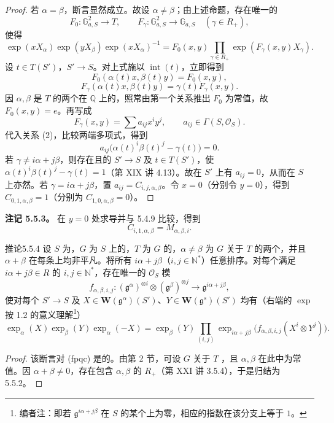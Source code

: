 \begin{proof}
若 $\alpha=\beta$，断言显然成立。故设 $\alpha\ne\beta$；由上述命题，存在唯一的
\[F_0:\mathbb G_{a,S}^2\to T,\qquad F_\gamma:\mathbb G_{a,S}^2\to\mathbb G_{a,S}\quad(\gamma\in R_+),\]
使得
\[\exp(xX_\alpha)\exp(yX_\beta)\exp(xX_\alpha)^{-1}
=F_0(x,y)\prod_{\gamma\in R_+}\exp(F_\gamma(x,y)X_\gamma).\]
设 $t\in T(S')$，$S'\to S$。对上式施以 $\operatorname{int}(t)$，立即得到
\[F_0(\alpha(t)x,\beta(t)y)=F_0(x,y),\tag{1}\]
\[F_\gamma(\alpha(t)x,\beta(t)y)=\gamma(t)F_\gamma(x,y).\tag{2}\]
因 $\alpha,\beta$ 是 $T$ 的两个在 $\mathbb Q$ 上的，照常由第一个关系推出 $F_0$ 为常值，故 $F_0(x,y)=e$。再写成
\[F_\gamma(x,y)=\sum a_{ij}x^iy^j,\qquad a_{ij}\in\Gamma(S,\mathcal O_S).\]
代入关系 (2)，比较两端多项式，得到
\[a_{ij}\bigl(\alpha(t)^i\beta(t)^j-\gamma(t)\bigr)=0.\]
若 $\gamma\ne i\alpha+j\beta$，则存在且的 $S'\to S$ 及 $t\in T(S')$，使 $\alpha(t)^i\beta(t)^j-\gamma(t)=1$（第 XIX 讲 4.13）。故在 $S'$ 上有 $a_{ij}=0$，从而在 $S$ 上亦然。若 $\gamma=i\alpha+j\beta$，置 $a_{ij}=C_{i,j,\alpha,\beta}$。令 $x=0$（分别令 $y=0$），得到 $C_{0,1,\alpha,\beta}=1$（分别为 $C_{1,0,\alpha,\beta}=0$）。
\end{proof}
\textbf{注记 5.5.3。} 在 $y=0$ 处求导并与 5.4.9 比较，得到
\[C_{i,1,\alpha,\beta}=M_{\alpha,\beta,i}.\]
\begin{SGAresult}{推论}{5.5.4}
设 $S$ 为，$G$ 为 $S$ 上的，$T$ 为 $G$ 的，$\alpha\ne\beta$ 为 $G$ 关于 $T$ 的两个，并且 $\alpha+\beta$ 在每条上均非平凡。将所有 $i\alpha+j\beta$（$i,j\in\mathbb N^*$）任意排序。对每个满足 $i\alpha+j\beta\in R$ 的 $i,j\in\mathbb N^*$，存在唯一的 $\mathcal O_S$ 模
\[f_{\alpha,\beta,i,j}:(\mathfrak g^\alpha)^{\otimes i}\otimes(\mathfrak g^\beta)^{\otimes j}\longrightarrow\mathfrak g^{i\alpha+j\beta},\]
使对每个 $S'\to S$ 及 $X\in\mathbf W(\mathfrak g^\alpha)(S')$、$Y\in\mathbf W(\mathfrak g^s)(S')$ 均有（右端的 $\exp$ 按 1.2 的意义理解\footnote{编者注：即若 $\mathfrak g^{i\alpha+j\beta}$ 在 $S$ 的某个上为零，相应的指数在该分支上等于 $1$。}）
\[\exp_\alpha(X)\exp_\beta(Y)\exp_\alpha(-X)
=\exp_\beta(Y)\prod_{(i,j)}\exp_{i\alpha+j\beta}\bigl(f_{\alpha,\beta,i,j}(X^i\otimes Y^j)\bigr).\]
\end{SGAresult}
\begin{proof}
该断言对 (fpqc) 是的。由第 2 节，可设 $G$ 关于 $T$ ，且 $\alpha,\beta$ 在此中为常值。因 $\alpha+\beta\ne0$，存在包含 $\alpha,\beta$ 的 $R_+$（第 XXI 讲 3.5.4），于是归结为 5.5.2。
\end{proof}
